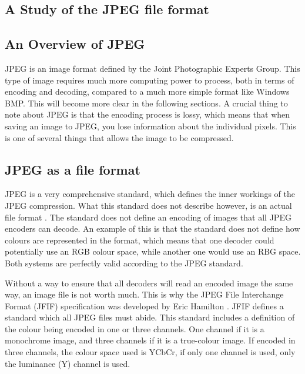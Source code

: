 \begin{infobox}{\section[A Study of the JPEG File Format]{A Study of the JPEG file format}\label{sec:jpegStudy}}

\subsection*{An Overview of JPEG}
\vspace{-2.5mm}
JPEG is an image format defined by the Joint Photographic Experts Group. 
This type of image requires much more computing power to process, both in terms of encoding and decoding, compared to a much more simple format like Windows BMP. This will become more clear in the following sections. 
A crucial thing to note about JPEG is that the encoding process is lossy, which means that when saving an image to JPEG, you lose information about the individual pixels. This is one of several things that allows the image to be compressed.

\vspace{4mm}
\subsection*{JPEG as a file format}
\vspace{-2.5mm}
JPEG is a very comprehensive standard, which defines the inner workings of the JPEG compression. 
What this standard does not describe however, is an actual file format \citep{Miano1999}. 
The standard does not define an encoding of images that all JPEG encoders can decode.
An example of this is that the standard does not define how colours are represented in the format, which means that one decoder could potentially use an RGB colour space, while another one would use an RBG space.
Both systems are perfectly valid according to the JPEG standard.

Without a way to ensure that all decoders will read an encoded image the same way, an image file is not worth much. This is why the JPEG File Interchange Format (JFIF) specification was developed by Eric Hamilton \citep{JFIFSpecs}. JFIF defines a standard which all JPEG files must abide. This standard includes a definition of the colour being encoded in one or three channels. One channel if it is a monochrome image, and three channels if it is a true-colour image. If encoded in three channels, the colour space used is YCbCr, if only one channel is used, only the luminance (Y) channel is used.


\end{infobox}
